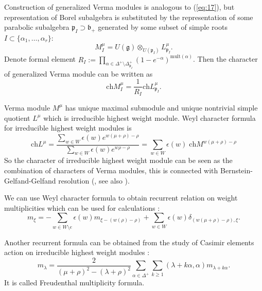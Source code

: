 \documentclass[preprint,12pt]{elsarticle}
\newcommand{\gf}{\mathfrak{g}}
\newcommand{\bff}{\mathfrak{b}}
\newcommand{\pf}{\mathfrak{p}}
\begin{document}
Construction of generalized Verma modules is analogous to (\ref{eq:17}), but representation of Borel subalgebra is substituted by the representation of some parabolic subalgebra $\pf_{I}\supset \bff_{+}$ generated by some subset of simple roots $I\subset \{\alpha_{1},\dots, \alpha_{r}\}$:
\begin{equation*}
M_{I}^{\mu}=U\left( \gf\right)\otimes _{U\left( \pf_{I}\right) }L_{\pf_{I}}^{\mu}.
\end{equation*}
Denote formal element $R_{I}:=\prod_{\alpha \in
\Delta ^{+}\setminus \Delta _{\pf_{I}}^{+}}\left( 1-e^{-\alpha
}\right) ^{\mathrm{mult}(\alpha )}$. Then the character of generalized Verma module can be written as
\begin{equation}
  \label{eq:18}
  \mathrm{ch}M_{I}^{\mu}=\frac{1}{R_{I}}\mathrm{ch}L_{\pf_{I}}^{\mu }.
\end{equation}

Verma module $M^{\mu}$ has unique maximal submodule and unique nontrivial simple quotient $L^{\mu}$ which is irreducible highest weight module. 
Weyl character formula for irreducible highest weight modules is
\begin{equation}
  \label{eq:13}
  \mathrm{ch} L^{\mu}=\frac{\sum_{w\in W} \epsilon(w) e^{w(\mu+\rho)-\rho}}{\sum_{w\in W}\epsilon(w) e^{w\rho-\rho}}=\sum_{w\in W} \epsilon(w)\; \mathrm{ch} M^{w(\mu+\rho)-\rho}
\end{equation}
So the character of irreducible highest weight module can be seen as the combination of characters of Verma modules, this is connected with Bernstein-Gelfand-Gelfand resolution (\cite{bernstein1976category,bernstein1971structure}, see also \cite{humphreys2008representations}). 

We can use Weyl character formula to obtain recurrent relation on weight multiplicities which can be used for calculations \cite{il2010folded,kulish4sfa}:
\begin{equation}
\label{eq:14}
m_{\xi }=-\sum_{w\in W\setminus e}\epsilon (w)m_{\xi
-\left( w(\rho )-\rho \right) }+\sum_{w\in W}\epsilon
(w)\delta _{\left( w(\mu +\rho )-\rho \right) ,\xi }.  
\end{equation}

Another recurrent formula can be obtained from the study of Casimir elements action on irreducible highest weight modules \cite{humphreys1997introduction}:
\begin{equation}
  \label{eq:15}
  m_{\lambda}=\frac{2}{(\mu+\rho)^{2}-(\lambda+\rho)^{2}}\sum_{\alpha\in \Delta^{+}}\sum_{k\geq 1} (\lambda+k\alpha,\alpha)m_{\lambda+k\alpha}.
\end{equation}
It is called Freudenthal multiplicity formula. 
\end{document}
